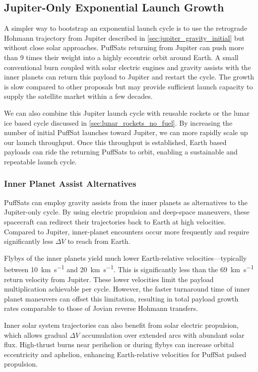 \documentclass{article}
\begin{document}
{\subsection{Jupiter-Only Exponential Launch Growth}\label{sec:jupiter_only_growth}
A simpler way to bootstrap an exponential launch cycle is to use the retrograde Hohmann trajectory from Jupiter described in \autoref{sec:jupiter_gravity_initial} but without close solar approaches.   PuffSats returning from Jupiter can push more than 9 times their weight into a highly eccentric orbit around Earth.   A small conventional burn coupled with solar electric engines and gravity assists with the inner planets can return this payload to Jupiter and restart the cycle.     The growth is slow compared to other proposals but may provide sufficient launch capacity to supply the satellite market within a few decades.

We can also combine this Jupiter launch cycle with reusable rockets or the lunar ice based cycle discussed in \autoref{sec:lunar_rockets_no_fuel}.  By increasing the number of initial PuffSat launches toward Jupiter, we can more rapidly scale up our launch throughput. Once this throughput is established, Earth based payloads can ride the returning PuffSats to orbit, enabling a sustainable and repeatable launch cycle.

\subsubsection{Inner Planet Assist Alternatives}
PuffSats can employ gravity assists from the inner planets as alternatives to the Jupiter-only cycle. By using electric propulsion and deep-space maneuvers, these spacecraft can redirect their trajectories back to Earth at high velocities. Compared to Jupiter, inner-planet encounters occur more frequently and require significantly less $\Delta V$ to reach from Earth.   

Flybys of the inner planets yield much lower Earth-relative velocities---typically between \SI{10}{\kilo\meter\per\second} and \SI{20}{\kilo\meter\per\second}.  This is significantly less than the \SI{69}{\kilo\meter\per\second} return velocity from Jupiter. These lower velocities limit the payload multiplication achievable per cycle. However, the faster turnaround time of inner planet maneuvers can offset this limitation, resulting in total payload growth rates comparable to those of Jovian reverse Hohmann transfers. 

Inner solar system trajectories can also benefit from solar electric propulsion, which allows gradual 
$\Delta V$ accumulation over extended arcs with abundant solar flux. High-thrust burns near perihelion or during flybys can increase orbital eccentricity and aphelion, enhancing Earth-relative velocities for PuffSat pulsed propulsion.
 
}
\end{document}
